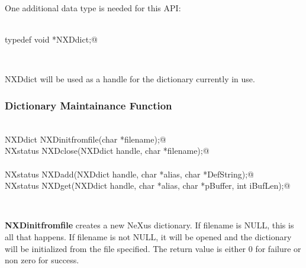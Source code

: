 \documentclass[12pt]{article}
\begin{document}
  One additional data type is needed for this API:
\begin{flushleft} \small
\begin{minipage}{\linewidth} \label{scrap1}
\vspace{-1ex}
\begin{list}{}{} \item
\mbox{}\verb@@\\
\mbox{}\verb@   typedef void *NXDdict;@\\
\end{list}
\vspace{-1ex}
\footnotesize\addtolength{\baselineskip}{-1ex}
\end{minipage}\\[4ex]
\end{flushleft}
NXDdict will be used as a handle for the dictionary currently in use.

\subsubsection{Dictionary Maintainance Function}
\begin{flushleft} \small
\begin{minipage}{\linewidth} \label{scrap2}
\vspace{-1ex}
\begin{list}{}{} \item
\mbox{}\verb@@\\
\mbox{}\verb@   NXDdict NXDinitfromfile(char *filename);@\\
\mbox{}\verb@   NXstatus NXDclose(NXDdict handle, char *filename);@\\
\mbox{}\verb@@\\
\mbox{}\verb@   NXstatus NXDadd(NXDdict handle, char *alias, char *DefString);@\\
\mbox{}\verb@   NXstatus NXDget(NXDdict handle, char *alias, char *pBuffer, int iBufLen);@\\
\end{list}
\vspace{-1ex}
\footnotesize\addtolength{\baselineskip}{-1ex}
\end{minipage}\\[4ex]
\end{flushleft}
{\bf NXDinitfromfile} creates a new NeXus dictionary. If filename is NULL, this
  is all that happens. If filename is not NULL, it will be opened and the
  dictionary will be initialized from the file specified.  The return value
  is either 0 for failure or non zero for success. 
\end{document}
